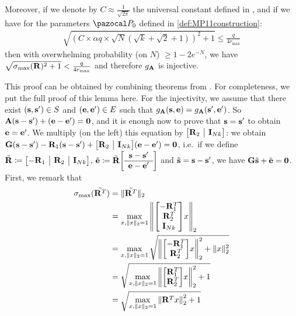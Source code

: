 {\begin{lemmaE}[][]
    Moreover, if we denote by $C \approx \frac{1}{\sqrt{2\pi}}$ the universal constant defined in \cite[Lem.~1.9]{MP11}, and if we have for the parameters $\cP_0$ defined in \cref{def:MP11construction}:
    \begin{align}
      \sqrt{\left(C \times \alpha q \times \sqrt{N}(\sqrt{k}+\sqrt{2}+1)\right)^2 + 1} \leq \frac{q}{4 r_{\max}}\label{eq:linkWithRmax}
    \end{align}
    then with overwhelming probability (on $N$) $\geq 1-2 e^{-N}$, we have $\sqrt{\sigma_{\max}(\mathbf{R})^2 +1 } < \frac{q}{4 r_{\max}}$ and therefore $g_{\mathbf{A}}$ is injective.
  \end{lemmaE}
  \begin{proofE}
    This proof can be obtained by combining theorems from \cite{MP11}. For completeness, we put the full proof of this lemma here. For the injectivity, we assume that there exist $(\mathbf{s},\mathbf{s}') \in S$ and $(\mathbf{e},\mathbf{e}') \in E$ such that $g_{\mathbf{A}}(\mathbf{s},\mathbf{e}) = g_{\mathbf{A}}(\mathbf{s}',\mathbf{e}')$. So $\mathbf{A}(\mathbf{s}-\mathbf{s}')+(\mathbf{e}-\mathbf{e}')=\mathbf{0}$, and it is enough now to prove that $\mathbf{s}=\mathbf{s}'$ to obtain $\mathbf{e}=\mathbf{e}'$. We multiply (on the left) this equation by $\HorizBlockMatrix{\vect{R}_2}{\vect{I}_{Nk}}$: we obtain $\vect{G}(\vect{s}-\vect{s}')-\vect{R}_1 (\vect{s}-\vect{s}')+\HorizBlockMatrix{\vect{R}_2}{\vect{I}_{Nk}}(\vect{e}-\vect{e}') = \vect{0}$, i.e.\ if we define $\tilde{\vect{R}} \eqdef \BlockMatrix{c|c|c}{-\vect{R}_1 & \vect{R}_2 & \vect{I}_{Nk} }$, $\tilde{\vect{e}} \eqdef \tilde{\vect{R}} \SmallBlockMatrix{\vect{s}-\vect{s}'}{\vect{e}-\vect{e}'}$ and $\tilde{\mathbf{s}} = \mathbf{s}-\mathbf{s}'$, we have $\mathbf{G}\tilde{\mathbf{s}}+\tilde{\mathbf{e}} = \mathbf{0}$. First, we remark that
    \begingroup
    \allowdisplaybreaks
    \begin{align}
      \sigma_{\max}(\tilde{\vect{R}^T})
      &= \|\tilde{\vect{R}^T}\|_2\nonumber\\
      &= \max_{x, \|x\|_2=1} \left\|\BlockMatrix{c}{-\vect{R}_1^T \tabularnewline \vect{R}_2^T \tabularnewline \vect{I}_{Nk} } x\right\|_2 \nonumber\\
      &= \max_{x, \|x\|_2=1} \sqrt{\left\|\BlockMatrix{c}{-\vect{R}_1^T \tabularnewline \vect{R}_2^T} x\right\|_2^2 + \|x\|_2^2}\nonumber\\
      &= \sqrt{\max_{x, \|x\|_2=1}\left\|\BlockMatrix{c}{\vect{R}_1^T \tabularnewline \vect{R}_2^T} x\right\|_2^2 + 1}\nonumber\\
      &= \sqrt{\max_{x, \|x\|_2=1}\left\|\vect{R}^T x\right\|_2^2 + 1}\nonumber\\

\end{align}
\end{proofE}}
